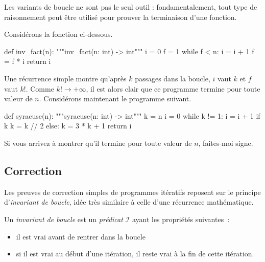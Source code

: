 \documentclass{magnolia}
\begin{document}
\vspace{2ex}
Les variants de boucle ne sont pas le seul outil :
fondamentalement, tout type de raisonnement peut être utilisé pour
prouver la terminaison d'une fonction.
\vspace{2ex}
\begin{exemples}
  \exemple
    Considérons la fonction ci-dessous.
\begin{pythoncodeline}
def inv_fact(n):
    """inv_fact(n: int) -> int"""
    i = 0
    f = 1
    while f < n:
        i = i + 1
        f = f * i
    return i
\end{pythoncodeline}
    Une récurrence simple montre qu'après $k$ passages
  dans la boucle, $i$ vaut $k$  et $f$ vaut $k!$.
  Comme $k! \to +\infty$,
  il est alors \og clair \fg que ce programme termine pour toute valeur de $n$.
\exemple
  Considérons maintenant le programme suivant.
\begin{pythoncodeline}
def syracuse(n):
    """syracuse(n: int) -> int"""
    k = n
    i = 0
    while k != 1:
        i = i + 1
        if k %
            k = k // 2
        else:
            k = 3 * k + 1
    return i
\end{pythoncodeline}
  Si vous arrivez à montrer qu'il termine pour toute valeur de $n$,
  faites-moi signe.
  \end{exemples}

\subsection{Correction}

Les preuves de correction simples de programmes itératifs reposent sur
le principe d'\emph{invariant de boucle}, idée très similaire à celle
d'une récurrence mathématique.

\begin{definition}[nom={Invariant de boucle}]
  Un \emph{invariant de boucle} est un \emph{prédicat} $\mathcal{I}$ ayant les propriétés suivantes~:
  \begin{itemize}
    \item il est vrai avant de rentrer dans la boucle
    \item si il est vrai au début d'une itération, il reste vrai à la fin de cette itération.
  \end{itemize}
\end{definition}
\end{document}
